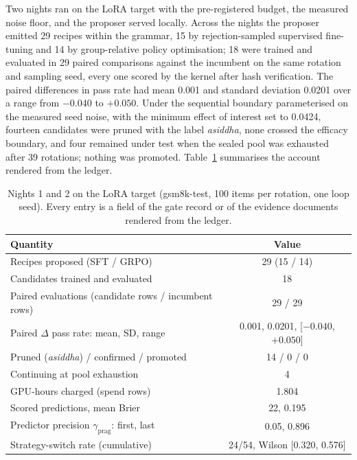 Two nights ran on the LoRA target with the pre-registered budget, the measured noise floor, and the proposer served locally. Across the nights the proposer emitted 29 recipes within the grammar, 15 by rejection-sampled supervised fine-tuning and 14 by group-relative policy optimisation; 18 were trained and evaluated in 29 paired comparisons against the incumbent on the same rotation and sampling seed, every one scored by the kernel after hash verification. The paired differences in pass rate had mean 0.001 and standard deviation 0.0201 over a range from $-0.040$ to $+0.050$. Under the sequential boundary parameterised on the measured seed noise, with the minimum effect of interest set to 0.0424, fourteen candidates were pruned with the label \emph{asiddha}, none crossed the efficacy boundary, and four remained under test when the sealed pool was exhausted after 39 rotations; nothing was promoted. Table~\ref{tab:l4-nights} summarises the account rendered from the ledger.

\begin{table}[t]
\centering
\caption{Nights 1 and 2 on the LoRA target (gsm8k-test, 100 items per rotation, one loop seed). Every entry is a field of the gate record or of the evidence documents rendered from the ledger.}
\label{tab:l4-nights}
\begin{tabular}{lc}
\toprule
\textbf{Quantity} & \textbf{Value} \\
\midrule
Recipes proposed (SFT / GRPO) & 29 (15 / 14) \\
Candidates trained and evaluated & 18 \\
Paired evaluations (candidate rows / incumbent rows) & 29 / 29 \\
Paired $\Delta$ pass rate: mean, SD, range & 0.001, 0.0201, [$-0.040$, $+0.050$] \\
Pruned (\emph{asiddha}) / confirmed / promoted & 14 / 0 / 0 \\
Continuing at pool exhaustion & 4 \\
GPU-hours charged (spend rows) & 1.804 \\
Scored predictions, mean Brier & 22, 0.195 \\
Predictor precision $\gamma_{\mathrm{prag}}$: first, last & 0.05, 0.896 \\
Strategy-switch rate (cumulative) & 24/54, Wilson [0.320, 0.576] \\
\bottomrule
\end{tabular}
\end{table}

